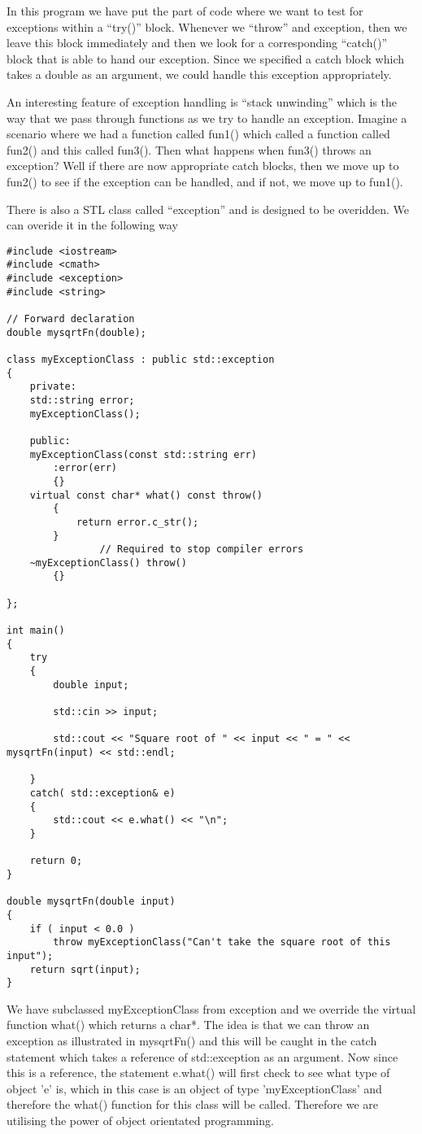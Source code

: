 In this program we have put the part of code where we want to test for
exceptions within a ``try()'' block. Whenever we ``throw'' and
exception, then we leave this block immediately and then we look for a
corresponding ``catch()'' block that is able to hand our
exception. Since we specified a catch block which takes a double as an
argument, we could handle this exception appropriately. 

An interesting feature of exception handling is ``stack unwinding''
which is the way that we pass through functions as we try to handle an
exception. Imagine a scenario where we had a function called fun1()
which called a function called fun2() and this called fun3(). Then
what happens when fun3() throws an exception? Well if there are now
appropriate catch blocks, then we move up to fun2() to see if the
exception can be handled, and if not, we move up to fun1(). 

There is also a STL class called ``exception'' and is designed to be
overidden. We can overide it in the following way
\begin{lstlisting}
#include <iostream>
#include <cmath>
#include <exception>
#include <string>

// Forward declaration 
double mysqrtFn(double);

class myExceptionClass : public std::exception
{
	private:
	std::string error;
	myExceptionClass();

	public:
	myExceptionClass(const std::string err)
		:error(err)
		{}
	virtual const char* what() const throw()
		{
			return error.c_str();
		}
                // Required to stop compiler errors
	~myExceptionClass() throw() 
		{}
	
};

int main()
{
	try
	{
		double input;
		
		std::cin >> input;
		
		std::cout << "Square root of " << input << " = " << mysqrtFn(input) << std::endl;
		
	}
	catch( std::exception& e)
	{
		std::cout << e.what() << "\n";
	}
	
	return 0;
}

double mysqrtFn(double input)
{
	if ( input < 0.0 )
		throw myExceptionClass("Can't take the square root of this input");
	return sqrt(input);
}
\end{lstlisting}
We have subclassed myExceptionClass from exception and we override the
virtual function what() which returns a char*. The idea is that we can
throw an exception as illustrated in mysqrtFn() and this will be
caught in the catch statement which takes a reference of
std::exception as an argument. Now since this is a reference, the
statement e.what() will first check to see what type of object 'e' is,
which in this case is an object of type 'myExceptionClass' and
therefore the what() function for this class will be called. Therefore
we are utilising the power of object orientated programming. 


